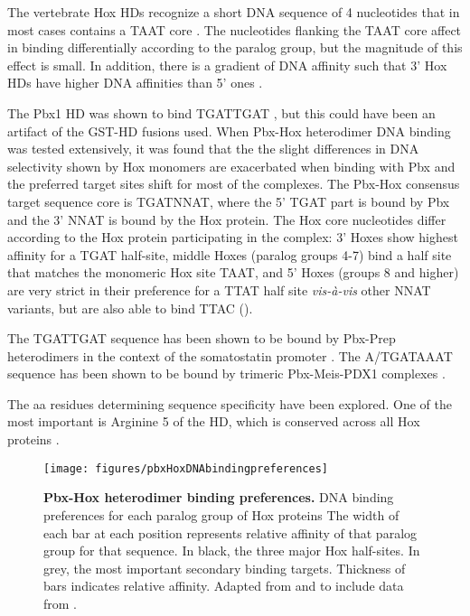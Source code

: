 The vertebrate Hox \acp{HD} recognize a short DNA sequence of 4 nucleotides that in most cases contains a TAAT core \parencite{Treisman1992, Catron1993}. The nucleotides flanking the TAAT core affect in binding differentially according to the paralog group, but the magnitude of this effect is small. In addition, there is a gradient of DNA affinity such that 3' Hox \acp{HD} have higher DNA affinities than 5' ones \parencite{Pellerin1994}. %


The Pbx1 \ac{HD} was shown to bind TGATTGAT \parencite{VanDijk1993}, but this could have been an artifact of the GST-\ac{HD} fusions used. When Pbx-Hox heterodimer DNA binding was tested extensively, it was found that the the slight differences in DNA selectivity shown by Hox monomers are exacerbated when binding with Pbx and the preferred target sites shift for most of the complexes. The Pbx-Hox consensus target sequence core is TGATNNAT, where the 5' TGAT part is bound by Pbx and the 3' NNAT is bound by the Hox protein. The Hox core nucleotides differ according to the Hox protein participating in the complex: 3' Hoxes show highest affinity for a TGAT half-site, middle Hoxes (paralog groups 4-7) bind a half site that matches the monomeric Hox site TAAT, and 5' Hoxes (groups 8 and higher) are very strict in their preference for a TTAT half site \textit{vis-à-vis} other NNAT variants, but are also able to bind TTAC (\cite{Chang1996, Chan1997, Shen1997a}). %

The TGATTGAT sequence has been shown to be bound by Pbx-Prep heterodimers in the context of the somatostatin promoter \parencite{Goudet1999}. The A/TGATAAAT sequence has been shown to be bound by trimeric Pbx-Meis-PDX1 complexes \parencite{Liu2001}.

The \ac{aa} residues determining sequence specificity have been explored. One of the most important is Arginine 5 of the \ac{HD}, which is conserved across all Hox proteins \parencite{Phelan1997}. %


\begin{figure}[]
  
  \centering
  \texttt{[image: figures/pbxHoxDNAbindingpreferences]}
  \caption[Pbx-Hox heterodimer binding preferences]{\textbf{Pbx-Hox heterodimer binding preferences.} DNA binding preferences for each paralog group of Hox proteins The width of each bar at each position represents relative affinity of that paralog group for that sequence. In black, the three major Hox half-sites. In grey, the most important secondary binding targets. Thickness of bars indicates relative affinity. Adapted from \textcite{Shen1997a} and \textcite{Shen1997} to include data from \textcite{Slattery2011}.}
  \label{fig:PbxHoxBinding}
\end{figure}

